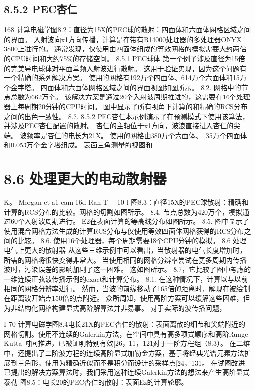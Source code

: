 \documentclass[UTF8,11pt,a4paper,openany,fontset=fandol]{ctexbook}
\begin{document}
\subsection{8.5.2 PEC杏仁}
168 计算电磁学图8.2：直径为15X的PEC球的散射：四面体和六面体网格区域之间的界面。 入射波向x1方向传播，计算是在带有R14000处理器的多处理器ONYX 3800上进行的。 通常发现，仅使用由四面体组成的等效网格的模拟需要大约两倍的CPU时间和大约75\%的存储空间。 8.5.1 PEC球体 第一个例子涉及直径为15倍的完美导电球体对平面单频入射波进行散射。 这用于验证实现，因为这个问题有一个精确的系列解决方案。 使用的网格有192万个四面体、614万个六面体和15万个金字塔。 四面体和六面体网格区域之间的界面视图如图所示。 8.2. 网格中的节点总数为662万个。 该解决方案是通过20个入射波周期推进的，这需要在16个处理器上每周期20分钟的CPU时间。 图中显示了所有视角下计算的和精确的RCS分布之间的出色一致性。 8.3. 8.5.2 PEC杏仁本示例演示了在预测模式下使用该算法，并涉及PEC杏仁配置的散射。 杏仁的主轴位于x1方向，波浪直接进入杏仁的尖端。 波频率是杏仁的电长为21X。 使用的网格由380万个六面体、135万个四面体和0.053万个金字塔组成。 表面三角测量的视图和

\section{8.6 处理更大的电动散射器}
K。 Morgan et a1 cam 16d Ran T - -10 I 图8.3：直径15X的PEC球散射：精确和计算的RCS分布的比较。网格的切割如图所示。 8.4. 节点总数为420万个，模拟通过60个入射波周期进行。 E2在表面计算的等高线分布如图所示。 8.5. 图中显示了使用混合网格方法生成的计算RCS分布与仅使用等效四面体网格获得的RCS分布之间的比较。 8.6. 使用16个处理器，每个周期需要18个CPU分钟的模拟。 8.6 处理电气上更大的散射器 从这些三维示例中可以看出，当散射器的电气长度增加时，所需的网格将很快变得非常大。 当使用相同的网格分辨率尝试在更多周期内传播波时，污染误差的影响加剧了这一困难。 这如图所示。 8.7，它比较了图中考虑的一维连续正弦波传播示例的exact和计算分布。 8.1. 在这种情况下，计算以与以前相同的网格分辨率进行。 然而，当波的前缘移动了165倍的距离时，解现在被绘制在距离波开始点150倍的点附近。 众所周知，使用高阶方案可以缓解这些困难，但为非结构化网格构建显式高阶解算法并非易事。 对于实际的波传播问题，

I 70 计算电磁学图8.4电长21X的PEC杏仁的散射：表面离散的细节和尖端附近的网格切割。使用不连续的Galerkin方法，在空间中具有高多项式顺序和高阶Runge-Kutta 时间推进，已被证明特别有效[26，11，121对于一阶方程组（8.3）。 在二维中，还提出了二阶波方程的连续高阶显式加勒金方案，基于将经典光谱元素方法扩展到三角形，使用为精确近似而不是积分而设计的采样点[24，131。 在试图改进已提出的解决方案算法时，我们采用这种连续Galerkin方法的想法来产生高阶显式泰勒-图8.5：电长20的PEC杏仁的散射：表面Ez的计算轮廓。
\end{document}
